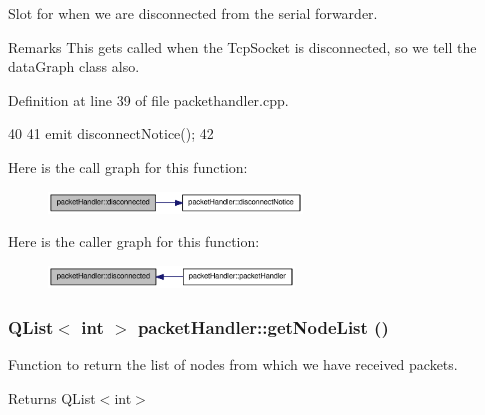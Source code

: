 Slot for when we are disconnected from the serial forwarder. 

\begin{DoxyRemark}{Remarks}
This gets called when the TcpSocket is disconnected, so we tell the dataGraph class also. 
\end{DoxyRemark}


Definition at line 39 of file packethandler.cpp.




\begin{DoxyCode}
40 {
41     emit disconnectNotice();
42 }
\end{DoxyCode}




Here is the call graph for this function:\nopagebreak
\begin{figure}[H]
\begin{center}
\leavevmode
\includegraphics[width=191pt]{classpacketHandler_a43223a8930a6af8c40c5889d8e4b9d4b_cgraph}
\end{center}
\end{figure}




Here is the caller graph for this function:\nopagebreak
\begin{figure}[H]
\begin{center}
\leavevmode
\includegraphics[width=185pt]{classpacketHandler_a43223a8930a6af8c40c5889d8e4b9d4b_icgraph}
\end{center}
\end{figure}


\hypertarget{classpacketHandler_a7d07166d577b014234ad311599ac3291}{
\subsubsection[{getNodeList}]{\setlength{\rightskip}{0pt plus 5cm}QList$<$ int $>$ packetHandler::getNodeList ()}}
\label{classpacketHandler_a7d07166d577b014234ad311599ac3291}
Function to return the list of nodes from which we have received packets. \begin{DoxyReturn}{Returns}
QList$<$int$>$ 
\end{DoxyReturn}


